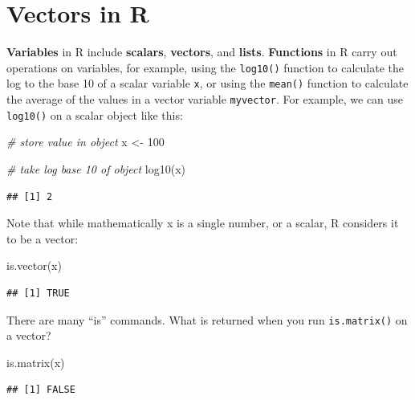 \documentclass[
]{book}
\newenvironment{Shaded}{\begin{snugshade}}{\end{snugshade}}
\newcommand{\CommentTok}[1]{\textcolor[rgb]{0.56,0.35,0.01}{\textit{#1}}}
\newcommand{\DecValTok}[1]{\textcolor[rgb]{0.00,0.00,0.81}{#1}}
\newcommand{\FunctionTok}[1]{\textcolor[rgb]{0.00,0.00,0.00}{#1}}
\newcommand{\NormalTok}[1]{#1}
\newcommand{\OtherTok}[1]{\textcolor[rgb]{0.56,0.35,0.01}{#1}}
\begin{document}
\hypertarget{vectors-in-r}{%
\section{Vectors in R}\label{vectors-in-r}}

\textbf{Variables} in R include \textbf{scalars}, \textbf{vectors}, and \textbf{lists}. \textbf{Functions} in R carry out operations on variables, for example, using the \texttt{log10()} function to calculate the log to the base 10 of a scalar variable \texttt{x}, or using the \texttt{mean()} function to calculate the average of the values in a vector variable \texttt{myvector}. For example, we can use \texttt{log10()} on a scalar object like this:

\begin{Shaded}
\begin{Highlighting}[]
\CommentTok{\# store value in object}
\NormalTok{x }\OtherTok{\textless{}{-}} \DecValTok{100}

\CommentTok{\# take log base 10 of object}
\FunctionTok{log10}\NormalTok{(x)}
\end{Highlighting}
\end{Shaded}

\begin{verbatim}
## [1] 2
\end{verbatim}

Note that while mathematically x is a single number, or a scalar, R considers it to be a vector:

\begin{Shaded}
\begin{Highlighting}[]
\FunctionTok{is.vector}\NormalTok{(x)}
\end{Highlighting}
\end{Shaded}

\begin{verbatim}
## [1] TRUE
\end{verbatim}

There are many ``is'' commands. What is returned when you run \texttt{is.matrix()} on a vector?

\begin{Shaded}
\begin{Highlighting}[]
\FunctionTok{is.matrix}\NormalTok{(x)}
\end{Highlighting}
\end{Shaded}

\begin{verbatim}
## [1] FALSE
\end{verbatim}
\end{document}
